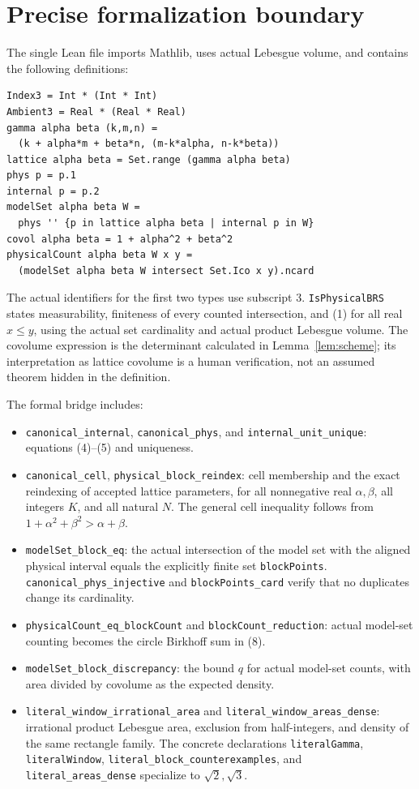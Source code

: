 \documentclass[11pt]{article}
\begin{document}
\section{Precise formalization boundary}
The single Lean file imports Mathlib, uses actual Lebesgue volume, and
contains the following definitions:
\begin{lstlisting}
Index3 = Int * (Int * Int)
Ambient3 = Real * (Real * Real)
gamma alpha beta (k,m,n) =
  (k + alpha*m + beta*n, (m-k*alpha, n-k*beta))
lattice alpha beta = Set.range (gamma alpha beta)
phys p = p.1
internal p = p.2
modelSet alpha beta W =
  phys '' {p in lattice alpha beta | internal p in W}
covol alpha beta = 1 + alpha^2 + beta^2
physicalCount alpha beta W x y =
  (modelSet alpha beta W intersect Set.Ico x y).ncard
\end{lstlisting}
The actual identifiers for the first two types use subscript $3$.
\nolinkurl{IsPhysicalBRS} states measurability, finiteness of every counted
intersection, and (1) for all real $x\le y$, using the actual set
cardinality and actual product Lebesgue volume.
The covolume expression is the determinant calculated in
Lemma~\ref{lem:scheme}; its interpretation as lattice covolume is a
human verification, not an assumed theorem hidden in the definition.

The formal bridge includes:
\begin{itemize}
\item \nolinkurl{canonical_internal}, \nolinkurl{canonical_phys}, and
\nolinkurl{internal_unit_unique}: equations (4)--(5) and uniqueness.
\item \nolinkurl{canonical_cell}, \nolinkurl{physical_block_reindex}:
cell membership and the exact reindexing of accepted lattice parameters,
for all nonnegative real $\alpha,\beta$, all integers $K$, and all
natural $N$. The general cell inequality follows from
$1+\alpha^2+\beta^2>\alpha+\beta$.
\item \nolinkurl{modelSet_block_eq}: the actual intersection of the model
set with the aligned physical interval equals the explicitly finite set
\nolinkurl{blockPoints}. \nolinkurl{canonical_phys_injective} and
\nolinkurl{blockPoints_card} verify that no duplicates change its cardinality.
\item \nolinkurl{physicalCount_eq_blockCount} and
\nolinkurl{blockCount_reduction}: actual model-set counting becomes the
circle Birkhoff sum in (8).
\item \nolinkurl{modelSet_block_discrepancy}: the bound $q$ for actual
model-set counts, with area divided by covolume as the expected density.
\item \nolinkurl{literal_window_irrational_area} and
\nolinkurl{literal_window_areas_dense}: irrational product Lebesgue area,
exclusion from half-integers, and density of the same rectangle family.
The concrete declarations \nolinkurl{literalGamma}, \nolinkurl{literalWindow},
\nolinkurl{literal_block_counterexamples}, and \nolinkurl{literal_areas_dense}
specialize to $\sqrt2,\sqrt3$.
\end{itemize}
\end{document}

